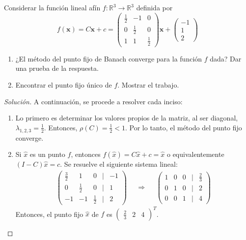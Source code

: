 \documentclass[12pt]{book}
\newcommand{\R}{\mathbb{R}}
\newenvironment{solucion}
  {\renewcommand\qedsymbol{$\square$}\begin{proof}[Solución]}
  {\end{proof}}
\begin{document}
 \eje Considerar la función lineal afín $f:\R^3\rightarrow\R^3$ definida por
\[ f(\bm{x})=C\bm{x}+c=\begin{pmatrix}
\frac{1}{2} & -1&0\\
0 & \frac{1}{2}&0\\
1&1&\frac{1}{2}
\end{pmatrix} \bm{x} + \begin{pmatrix}
-1\\
1\\
2
\end{pmatrix}\]
\renewcommand{\labelenumi}{(\alph{enumi})}
\begin{enumerate}
    \item ¿El método del punto fijo de Banach converge para la función $f$ dada? Dar una prueba de la respuesta.
    \item Encontrar el punto fijo único de $f$. Mostrar el trabajo.
\end{enumerate}
\begin{solucion}
A continuación, se procede a resolver cada inciso:
\renewcommand{\labelenumi}{(\alph{enumi})}
\begin{enumerate}
    \item Lo primero es determinar los valores propios de la matriz, al ser diagonal, $\lambda_{1,2,3}=\frac{1}{2}$.
Entonces, $\rho(C)=\frac{1}{2}<1$. Por lo tanto, el método del punto fijo converge.
\item Si $\hat{x}$ es un punto $f$, entonces $f(\hat{x})=C\hat{x}+c=\hat{x}$ o equivalentemente $(I-C)\hat{x}=c$. Se resuelve el siguiente sistema lineal:
\begin{align*}
    \begin{pmatrix}
    \frac{3}{2} & 1 & 0& | & -1\\
    0 & \frac{1}{2} &0& | & 1\\
    -1&-1&\frac{1}{2}&|&2
    \end{pmatrix} && \Rightarrow & & \begin{pmatrix}
    1 & 0 & 0& | & \frac{2}{3}\\
    0 & 1 &0& | & 2\\
    0&0&1&|&4
    \end{pmatrix}
\end{align*}
Entonces, el punto fijo $\hat{x}$ de $f$ es $\begin{pmatrix}
\frac{2}{3}&
2&
4
\end{pmatrix}^T$.
\end{enumerate}
\end{solucion}
\end{document}
